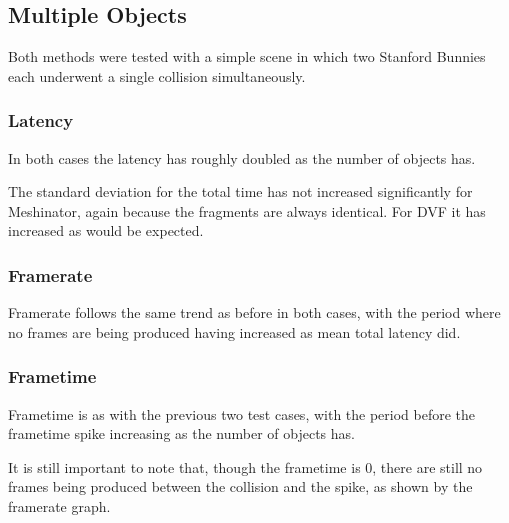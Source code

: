 \FloatBarrier

\clearpage
\subsection{Multiple Objects}

Both methods were tested with a simple scene in which two Stanford Bunnies each underwent a single collision simultaneously.

\FloatBarrier

\subsubsection{Latency}

In both cases the latency has roughly doubled as the number of objects has.

The standard deviation for the total time has not increased significantly for Meshinator, again because the fragments are always identical. For DVF it has increased as would be expected.

\subsubsection{Framerate}

Framerate follows the same trend as before in both cases, with the period where no frames are being produced having increased as mean total latency did.

\subsubsection{Frametime}

Frametime is as with the previous two test cases, with the period before the frametime spike increasing as the number of objects has.

It is still important to note that, though the frametime is 0, there are still no frames being produced between the collision and the spike, as shown by the framerate graph.

\FloatBarrier

